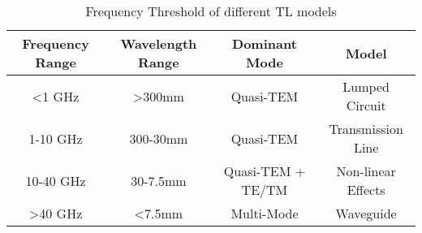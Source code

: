 \begin{table}
\caption{Frequency Threshold of different TL models}
\begin{tabular}{c|c|c|c}
\toprule
Frequency Range & Wavelength Range & Dominant Mode & Model \\
\midrule
\hline
<1 GHz & >300mm & Quasi-TEM & Lumped Circuit \\
1-10 GHz & 300-30mm & Quasi-TEM & Transmission Line \\
10-40 GHz & 30-7.5mm & Quasi-TEM + TE/TM & Non-linear Effects \\
>40 GHz & <7.5mm & Multi-Mode & Waveguide \\
\bottomrule
\end{tabular}
\end{table}